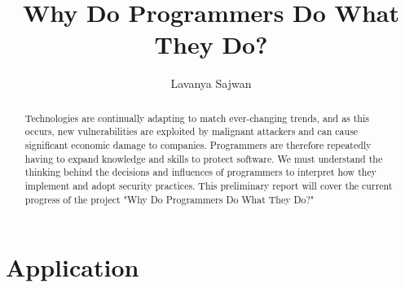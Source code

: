 \documentclass[11pt
              , a4paper
              , twoside
              , openright
              ]{report}
\title{Why Do Programmers Do What They Do?}
\author{Lavanya Sajwan}
\date{}
\begin{document}
\frontmatter



\begin{abstract}

Technologies are continually adapting to match ever-changing trends, and as this occurs, new vulnerabilities are exploited by malignant attackers and can cause significant economic damage to companies. Programmers are therefore repeatedly having to expand knowledge and skills to protect software. We must understand the thinking behind the decisions and influences of programmers to interpret how they implement and adopt security practices. This preliminary report will cover the current progress of the project "Why Do Programmers Do What They Do?"

\end{abstract}


\maketitle



\tableofcontents



\mainmatter









\backmatter






\appendix
\chapter{Application}

\end{document}
